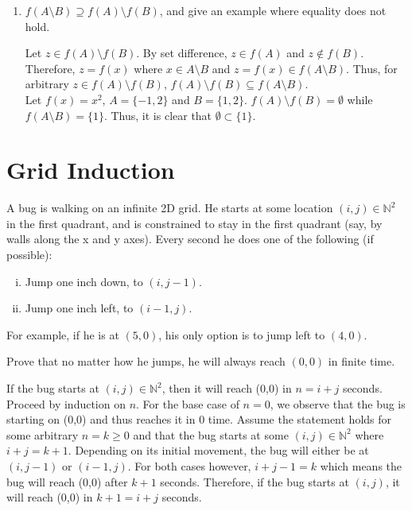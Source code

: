 \documentclass[11pt]{article}
\newcommand*{\Question}[1]{\vfill\pagebreak[3]\section{#1}}
\newenvironment{Answer}{\vspace{20pt}}{\vspace{20pt}}
\newcommand*{\N}{\mathbb{N}}
\begin{document}
\begin{enumerate}
    \item $f(A \setminus B) \supseteq f(A) \setminus f(B)$, and give an example where equality does not hold.
    \begin{Answer}
    
    Let $z \in f(A)\setminus f(B)$. By set difference, $z \in f(A)$ and $z \notin f(B)$. Therefore, $z=f(x)$ where $x \in A \setminus B$ and $z=f(x) \in  f(A \setminus B)$. Thus, for arbitrary $z \in f(A)\setminus f(B)$,  $f(A)\setminus f(B) \subseteq f(A \setminus B)$. \\
    
    Let $f(x)=x^2$, $A=\{-1, 2\}$ and $B=\{1,2\}$. $f(A) \setminus f(B)=\emptyset$ while $f(A \setminus B)=\{1\}$. Thus, it is clear that $\emptyset \subset \{1\}$. 
    \end{Answer}

\end{enumerate}

\clearpage

\Question{Grid Induction}

A bug is walking on an infinite 2D grid.
He starts at some location $(i, j) \in \N^2$ in the first quadrant,
and is constrained to stay in the first quadrant (say, by walls along the x and
y axes).
Every second he does one of the following (if possible):
\begin{enumerate}[(i)]
  \item Jump one inch down, to $(i, j-1)$.
  \item Jump one inch left, to $(i-1, j)$.
\end{enumerate}
For example, if he is at $(5, 0)$, his only option is to jump left to $(4, 0)$.

Prove that no matter how he jumps, he will always reach $(0, 0)$ in finite time.

\begin{Answer}
If the bug starts at $(i,j) \in \N^2$, then it will reach (0,0) in $n=i+j$ seconds. Proceed by induction on $n$. For the base case of $n=0$, we observe that the bug is starting on (0,0) and thus reaches it in 0 time. Assume the statement holds for some arbitrary $n=k \geq 0$ and that the bug starts at some $(i,j) \in \N^2$ where $i+j=k+1$. Depending on its initial movement, the bug will either be at $(i, j-1)$ or $(i-1, j)$. For both cases however, $i+j-1=k$ which means the bug will reach (0,0) after $k+1$ seconds. Therefore, if the bug starts at $(i, j)$, it will reach (0,0) in $k+1=i+j$ seconds. 

\end{Answer}
\end{document}
